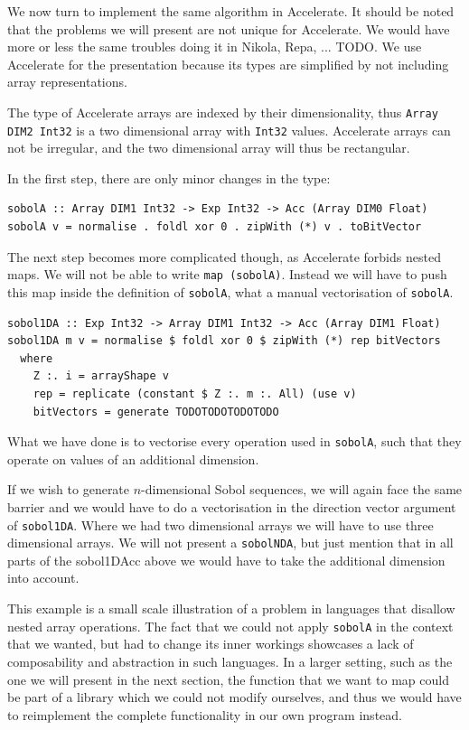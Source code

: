 \documentclass{llncs2e/llncs}
\begin{document}
We now turn to implement the same algorithm in Accelerate. It should
be noted that the problems we will present are not unique for
Accelerate. We would have more or less the same troubles doing it in
Nikola, Repa, ...  TODO. We use Accelerate for the presentation
because its types are simplified by not including array
representations. 

The type of Accelerate arrays are indexed by their dimensionality,
thus \verb|Array DIM2 Int32| is a two dimensional array with
\verb|Int32| values. Accelerate arrays can not be irregular, and the
two dimensional array will thus be rectangular.

In the first step, there are only minor changes in the type:
\begin{verbatim}
sobolA :: Array DIM1 Int32 -> Exp Int32 -> Acc (Array DIM0 Float)
sobolA v = normalise . foldl xor 0 . zipWith (*) v . toBitVector
\end{verbatim}

The next step becomes more complicated though, as Accelerate forbids
nested maps. We will not be able to write \verb|map (sobolA)|.
Instead we will have to push this map inside the definition of
\verb|sobolA|, what a manual vectorisation of \verb|sobolA|.
\begin{verbatim}
sobol1DA :: Exp Int32 -> Array DIM1 Int32 -> Acc (Array DIM1 Float)
sobol1DA m v = normalise $ foldl xor 0 $ zipWith (*) rep bitVectors
  where
    Z :. i = arrayShape v
    rep = replicate (constant $ Z :. m :. All) (use v)
    bitVectors = generate TODOTODOTODOTODO
\end{verbatim}
What we have done is to vectorise every operation used in
\verb|sobolA|, such that they operate on values of an additional
dimension.

If we wish to generate $n$-dimensional Sobol sequences, we will again
face the same barrier and we would have to do a vectorisation in the
direction vector argument of \verb|sobol1DA|. Where we had two
dimensional arrays we will have to use three dimensional arrays. We
will not present a \verb|sobolNDA|, but just mention that in all
parts of the sobol1DAcc above we would have to take the additional
dimension into account.

This example is a small scale illustration of a problem in languages
that disallow nested array operations. The fact that we could not
apply \verb|sobolA| in the context that we wanted, but had to change
its inner workings showcases a lack of composability and abstraction
in such languages. In a larger setting, such as the one we will
present in the next section, the function that we want to map could be
part of a library which we could not modify ourselves, and thus we
would have to reimplement the complete functionality in our own
program instead.
\end{document}

